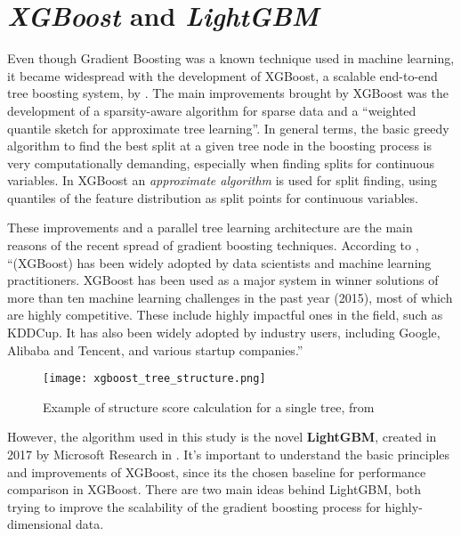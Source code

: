 \section{\textit{XGBoost} and \textit{LightGBM}}
\label{lightgbm-explanation}

Even though Gradient Boosting was a known technique used in machine learning, it became widespread with the development of XGBoost, a scalable end-to-end tree boosting system, by \cite{chen2016xgboost}. The main improvements brought by XGBoost was the development of a sparsity-aware algorithm for sparse data and a ``weighted quantile sketch for approximate tree learning''. In general terms, the basic greedy algorithm to find the best split at a given tree node in the boosting process is very computationally demanding, especially when finding splits for continuous variables. In XGBoost an \textit{approximate algorithm} is used for split finding, using quantiles of the feature distribution as split points for continuous variables. 

These improvements and a parallel tree learning architecture are the main reasons of the recent spread of gradient boosting techniques. According to \cite{chen2015xgboost}, ``(XGBoost) has been widely adopted by data scientists and machine learning practitioners. XGBoost has been used as a major system in winner solutions of more than ten machine learning challenges in the past year (2015), most of which are highly competitive. These include highly impactful ones in the field, such as KDDCup. It has also been widely adopted by industry users, including Google, Alibaba and Tencent, and various startup companies.''

\begin{figure}[!h]
    \centering
    \texttt{[image: xgboost\_tree\_structure.png]} 
    \caption{Example of structure score calculation for a single tree, from \cite{chen2015xgboost}}
    \label{fig:xgboost-tree} 
  \end{figure}
  

However, the algorithm used in this study is the novel \textbf{LightGBM}, created in 2017 by Microsoft Research in \cite{ke2017lightgbm}. It's important to understand the basic principles and improvements of XGBoost, since its the chosen baseline for performance comparison in XGBoost. There are two main ideas behind LightGBM, both trying to improve the scalability of the gradient boosting process for highly-dimensional data.

